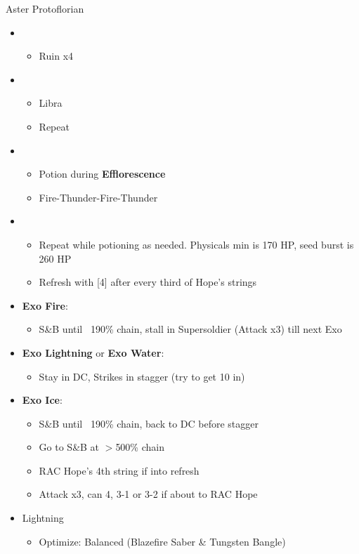 \begin{battle}[1:45]{Aster Protoflorian}
		\begin{itemize}
			\item \first
			      \begin{itemize}
				      \item Ruin x4
			      \end{itemize}
			\item \third
			      \begin{itemize}
				      \item Libra
				      \item Repeat
			      \end{itemize}
			\item \fourth
			      \begin{itemize}
				      \item Potion during \textbf{Efflorescence}
				      \item Fire-Thunder-Fire-Thunder
			      \end{itemize}
			\item \fifth
			      \begin{itemize}
				      \item Repeat while potioning as needed. Physicals min is 170 HP, seed burst is 260 HP
				      \item Refresh with [4] after every third of Hope's strings
			      \end{itemize}
			\item \textbf{Exo Fire}:
				  \begin{itemize}
				  	  \item S\&B until ~190\% chain, stall in Supersoldier (Attack x3) till next Exo
				  \end{itemize}
			\item \textbf{Exo Lightning} or \textbf{Exo Water}:
			      \begin{itemize}
				      \item Stay in DC, Strikes in stagger (try to get 10 in)
			      \end{itemize}
			\item \textbf{Exo Ice}:
			      \begin{itemize}
				      \item S\&B until ~190\% chain, back to DC before stagger
				      \item Go to S\&B at $>$500\% chain
				      \item RAC Hope's 4th string if into refresh
				      \item Attack x3, can 4, 3-1 or 3-2 if about to RAC Hope
			      \end{itemize}
		\end{itemize}
\end{battle}
	\begin{menu}
		\begin{itemize}
			\equip
			\begin{itemize}
				\item Lightning
				      \begin{itemize}
					      \item Optimize: Balanced (Blazefire Saber \& Tungsten Bangle)
				      \end{itemize}
			\end{itemize}
		\end{itemize}
	\end{menu}

	\vfill
\ 
\columnbreak
